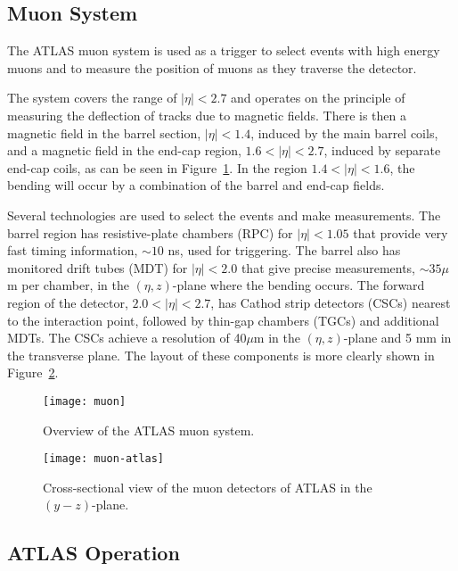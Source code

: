 \subsection{Muon System}

The ATLAS muon system is used as a trigger to select events with high energy muons and to measure the position of muons
as they traverse the detector.


The system covers the range of $|\eta| < 2.7$ and operates on the principle of measuring the deflection of tracks due to magnetic fields.
There is then a magnetic field in the barrel section, $|\eta| < 1.4$, induced by the main barrel coils, 
and a magnetic field in the end-cap region, $1.6 < |\eta| < 2.7$, induced by separate end-cap coils, as can be 
seen in Figure~\ref{fig:exp.atlas.muon.all}.
In the region $1.4 < |\eta| < 1.6$, the bending will occur by a combination of the barrel and end-cap fields.

Several technologies are used to select the events and make measurements.
The barrel region has resistive-plate chambers (RPC) for $|\eta| < 1.05$  that provide very fast timing information, $\sim 10$ ns,
used for triggering. The barrel also has monitored drift tubes (MDT) for $|\eta| < 2.0$ that give precise measurements, $\sim 35 \mu$m per chamber,
in the $\left(\eta,z\right)$-plane where the bending occurs.
The forward region of the detector, $2.0 < |\eta| < 2.7$,  has Cathod strip detectors (CSCs)  nearest to the interaction point,
followed by thin-gap chambers (TGCs) and additional MDTs. The CSCs achieve a resolution of 40$\mu$m in the $\left(\eta,z\right)$-plane
and 5 mm in the transverse plane.
The layout of these components is more clearly shown in Figure~\ref{fig:exp.atlas.muon}.


\begin{figure}[htb!]
\centering
\texttt{[image: muon]}
\caption{Overview of the ATLAS muon system.}%
\label{fig:exp.atlas.muon.all}
\end{figure} 


\begin{figure}[htb!]
\centering
\texttt{[image: muon-atlas]}
\caption{Cross-sectional view of the muon detectors of ATLAS in the $\left(y-z\right)$-plane.}%
\label{fig:exp.atlas.muon}
\end{figure} 

\subsection{ATLAS Operation}




